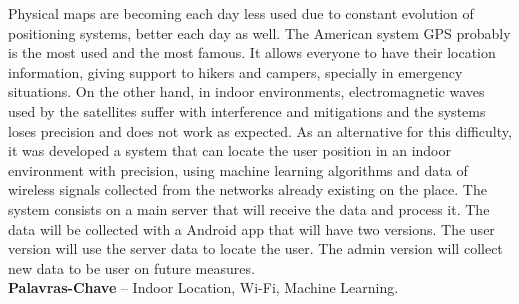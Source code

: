 \begin{resumo}

Physical maps are becoming each day less used due to constant evolution of positioning
systems, better each day as well. The American system GPS probably is the
most used and the most famous. It allows everyone to have their location information,
giving support to hikers and campers, specially in emergency situations. On the other
hand, in indoor environments, electromagnetic waves used by the satellites suffer with
interference and mitigations and the systems loses precision and does not work as expected.
As an alternative for this difficulty, it was developed a system that can locate
the user position in an indoor environment with precision, using machine learning algorithms
and data of wireless signals collected from the networks already existing on
the place. The system consists on a main server that will receive the data and process
it. The data will be collected with a Android app that will have two versions. The user
version will use the server data to locate the user. The admin version will collect new
data to be user on future measures.
%
\\[3\baselineskip]
%
\textbf{Palavras-Chave} -- Indoor Location, Wi-Fi, Machine Learning.
\end{resumo}
